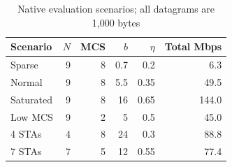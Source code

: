 \begin{table}[t]
\caption{Native evaluation scenarios; all datagrams are 1,000 bytes}
\label{tab:scenarios}
\centering\footnotesize
\setlength{\tabcolsep}{3pt}
\begin{tabular}{lrrrrr}
\toprule
Scenario & $N$ & MCS & $b$ & $\eta$ & Total Mbps \\
\midrule
Sparse & 9 & 8 & 0.7 & 0.2 & 6.3 \\
Normal & 9 & 8 & 5.5 & 0.35 & 49.5 \\
Saturated & 9 & 8 & 16 & 0.65 & 144.0 \\
Low MCS & 9 & 2 & 5 & 0.5 & 45.0 \\
4 STAs & 4 & 8 & 24 & 0.3 & 88.8 \\
7 STAs & 7 & 5 & 12 & 0.55 & 77.4 \\
\bottomrule
\end{tabular}
\end{table}
